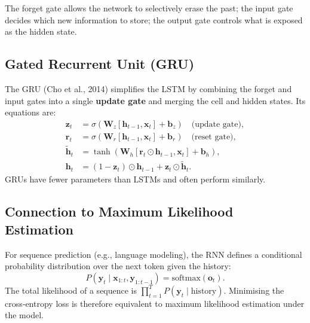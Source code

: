 \documentclass{tufte-handout}
\begin{document}
The forget gate allows the network to selectively erase the past; the input gate decides which new information to store; the output gate controls what is exposed as the hidden state.

\subsection{Gated Recurrent Unit (GRU)}

The GRU (Cho et al., 2014) simplifies the LSTM by combining the forget and input gates into a single \textbf{update gate} and merging the cell and hidden states. Its equations are:
\begin{align}
    \mathbf{z}_t &= \sigma(\mathbf{W}_z [\mathbf{h}_{t-1}, \mathbf{x}_t] + \mathbf{b}_z) \quad \text{(update gate)}, \\
    \mathbf{r}_t &= \sigma(\mathbf{W}_r [\mathbf{h}_{t-1}, \mathbf{x}_t] + \mathbf{b}_r) \quad \text{(reset gate)}, \\
    \tilde{\mathbf{h}}_t &= \tanh(\mathbf{W}_h [\mathbf{r}_t \odot \mathbf{h}_{t-1}, \mathbf{x}_t] + \mathbf{b}_h), \\
    \mathbf{h}_t &= (1 - \mathbf{z}_t) \odot \mathbf{h}_{t-1} + \mathbf{z}_t \odot \tilde{\mathbf{h}}_t.
\end{align}
GRUs have fewer parameters than LSTMs and often perform similarly.

\begin{marginfigure}
\centering
{}
\caption{Schematic of an LSTM cell. The cell state $\mathbf{c}_t$ (not shown separately) flows through the top, modulated by gates.}
\end{marginfigure}

\subsection{Connection to Maximum Likelihood Estimation}

For sequence prediction (e.g., language modeling), the RNN defines a conditional probability distribution over the next token given the history:
\[
P(\mathbf{y}_t \mid \mathbf{x}_{1:t}, \mathbf{y}_{1:t-1}) = \text{softmax}(\mathbf{o}_t).
\]
The total likelihood of a sequence is $\prod_{t=1}^T P(\mathbf{y}_t \mid \text{history})$. Minimising the cross‑entropy loss is therefore equivalent to maximum likelihood estimation under the model.
\end{document}
